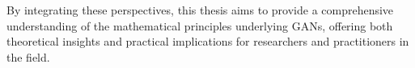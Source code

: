By integrating these perspectives, this thesis aims to provide a comprehensive understanding of the mathematical principles underlying GANs, offering both theoretical insights and practical implications for researchers and practitioners in the field.

